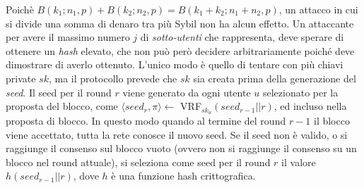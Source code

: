 Poichè $B(k_1; n_1, p) + B(k_2; n_2, p) = B(k_1+k_2; n_1 + n_2, p)$, un attacco in cui si divide una somma di denaro tra più Sybil non ha alcun effetto.
Un attaccante per avere il massimo numero $j$ di \emph{sotto-utenti} che rappresenta, deve sperare di ottenere un \emph{hash} elevato, che non può però decidere arbitrariamente poiché deve dimostrare di averlo ottenuto. L'unico modo è quello di tentare con più chiavi private $sk$, ma il protocollo prevede che $sk$ sia creata prima della generazione del \emph{seed}.
Il seed per il round $r$ viene generato da ogni utente $u$ selezionato per la proposta del blocco, come $\langle seed_r, \pi \rangle \leftarrow$ VRF$_{sk_u}(seed_{r-1} || r)$, ed incluso nella proposta di blocco. In questo modo quando al termine del round $r-1$ il blocco viene accettato, tutta la rete conosce il nuovo seed. Se il seed non è valido, o si raggiunge il consenso sul blocco vuoto (ovvero non si raggiunge il consenso su un blocco nel round attuale), si seleziona come seed per il round $r$ il valore $h(seed_{r-1} || r)$, dove $h$ è una funzione hash crittografica.

